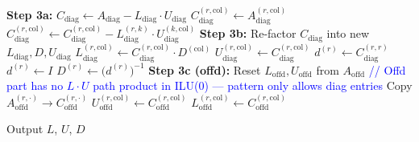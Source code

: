 \documentclass[11pt,a4paper]{article}
\newcommand{\Comment}[1]{\hfill\textcolor{blue}{// #1}}
\begin{document}
\begin{algorithm}[H]
\begin{algorithmic}[1]
    \Statex
    \Statex \textbf{Step 3a:} $C_{\text{diag}} \gets A_{\text{diag}} - L_{\text{diag}} \cdot U_{\text{diag}}$
            \State $C_{\text{diag}}^{(r,\text{col})} \gets A_{\text{diag}}^{(r,\text{col})}$
                    \State $C_{\text{diag}}^{(r,\text{col})} \gets
                        C_{\text{diag}}^{(r,\text{col})}
                        - L_{\text{diag}}^{(r,k)} \cdot U_{\text{diag}}^{(k,\text{col})}$
                \EndIf
            \EndFor
        \EndFor
    \EndFor
    \Statex
    \Statex \textbf{Step 3b:} Re-factor $C_{\text{diag}}$ into new $L_{\text{diag}}, D, U_{\text{diag}}$
                \State $\displaystyle L_{\text{diag}}^{(r,\text{col})}
                    \gets C_{\text{diag}}^{(r,\text{col})} \cdot D^{(\text{col})}$
                \State $U_{\text{diag}}^{(r,\text{col})} \gets C_{\text{diag}}^{(r,\text{col})}$
            \Else
                \State $d^{(r)} \gets C_{\text{diag}}^{(r,r)}$
                    \State $d^{(r)} \gets I$
                \EndIf
                \State $D^{(r)} \gets \bigl(d^{(r)}\bigr)^{-1}$
            \EndIf
        \EndFor
    \EndFor
    \Statex
        \Statex \textbf{Step 3c (offd):} Reset $L_{\text{offd}}, U_{\text{offd}}$ from $A_{\text{offd}}$
        \Comment{Offd part has no $L\cdot U$ path product in ILU(0) --- pattern only allows diag entries}
            \State Copy $A_{\text{offd}}^{(r,\cdot)} \to C_{\text{offd}}^{(r,\cdot)}$
                    \State $U_{\text{offd}}^{(r,\text{col})} \gets C_{\text{offd}}^{(r,\text{col})}$
                \Else
                    \State $L_{\text{offd}}^{(r,\text{col})} \gets C_{\text{offd}}^{(r,\text{col})}$
                \EndIf
            \EndFor
        \EndFor
    \EndIf
\EndFor

\State Output $L$, $U$, $D$
\end{algorithmic}
\end{algorithm}
\end{document}
